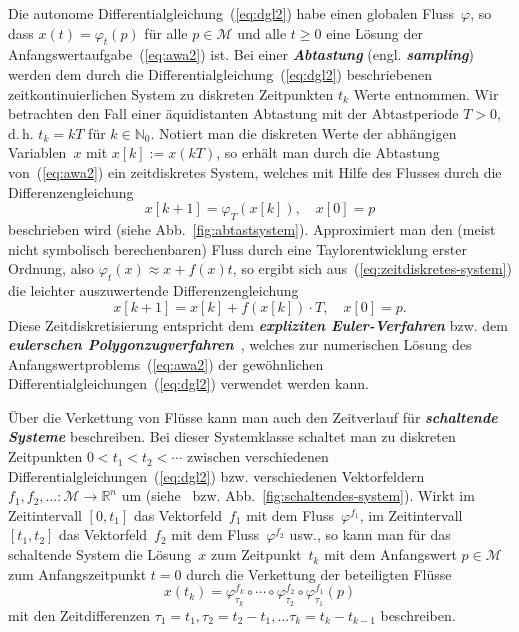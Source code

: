 \begin{remark}
\label{rem:Flussverkettung-zeitdiskret}Die autonome Differentialgleichung~(\ref{eq:dgl2})
habe einen globalen Fluss~$\varphi$, so dass $x(t)=\varphi_{t}(p)$
für alle $p\in\mathcal{M}$ und alle $t\geq0$ eine Lösung der Anfangswertaufgabe~(\ref{eq:awa2})
ist. Bei einer \textbf{\em Abtastung} (engl. \textbf{\em sampling})
werden dem durch die Differentialgleichung~(\ref{eq:dgl2}) beschriebenen
zeitkontinuierlichen System zu diskreten Zeitpunkten $t_{k}$ Werte
entnommen. Wir betrachten den Fall einer äquidistanten Abtastung mit
der Abtastperiode $T>0$, d.\,h. $t_{k}=kT$ für $k\in{\mathbb{N}_0}$. Notiert
man die diskreten Werte der abhängigen Variablen~$x$ mit $x[k]:=x(kT)$,
so erhält man durch die Abtastung von~(\ref{eq:awa2}) ein zeitdiskretes
System, welches mit Hilfe des Flusses durch die Differenzengleichung
\begin{equation}
x[k+1]=\varphi_{T}(x[k]),\quad x[0]=p\label{eq:zeitdiskretes-system}
\end{equation}
beschrieben wird (siehe Abb.~\ref{fig:abtastsystem}). Approximiert
man den (meist nicht symbolisch berechenbaren) Fluss durch eine Taylorentwicklung
erster Ordnung, also $\varphi_{t}(x)\approx x+f(x)t$, so ergibt sich
aus~(\ref{eq:zeitdiskretes-system}) die leichter auszuwertende Differenzengleichung
\[
x[k+1]=x[k]+f(x[k])\cdot T,\quad x[0]=p.
\]
Diese Zeitdiskretisierung entspricht dem \textbf{\em expliziten Euler-Verfahren}
bzw. dem \textbf{\em eulerschen Polygonzugverfahren}~\cite{bronstein2000,baerwolff2006},
welches zur numerischen Lösung des Anfangswertproblems~(\ref{eq:awa2})
der gewöhnlichen Differentialgleichungen~(\ref{eq:dgl2}) verwendet
werden kann.
\end{remark}


\begin{remark}
\label{rem:Flussverkettung-schaltende-Systeme}Über die Verkettung
von Flüsse kann man auch den Zeitverlauf für \textbf{\em schaltende Systeme}
beschreiben. Bei dieser Systemklasse schaltet man zu diskreten Zeitpunkten
$0<t_{1}<t_{2}<\cdots$ zwischen verschiedenen Differentialgleichungen~(\ref{eq:dgl2})
bzw. verschiedenen Vektorfeldern $f_{1},f_{2},\ldots:\mathcal{M}\to{\mathbb{R}}^{n}$
um (siehe~\cite{liberzon2003} bzw. Abb.~\ref{fig:schaltendes-system}).
Wirkt im Zeitintervall $[0,t_{1}]$ das Vektorfeld~$f_{1}$ mit dem
Fluss~$\varphi^{f_{1}}$, im Zeitintervall $[t_{1},t_{2}]$ das Vektorfeld~$f_{2}$
mit dem Fluss~$\varphi^{f_{2}}$ usw., so kann man für das schaltende
System die Lösung~$x$ zum Zeitpunkt~$t_{k}$ mit dem Anfangswert
$p\in\mathcal{M}$ zum Anfangszeitpunkt $t=0$ durch die Verkettung
der beteiligten Flüsse
\begin{equation}
x(t_{k})=\varphi_{\tau_{k}}^{f_{k}}\circ\cdots\circ\varphi_{\tau_{2}}^{f_{2}}\circ\varphi_{\tau_{1}}^{f_{1}}(p)\label{eq:verkettung-von-fluessen-geschaltet}
\end{equation}
mit den Zeitdifferenzen $\tau_{1}=t_{1},\tau_{2}=t_{2}-t_{1},\ldots\tau_{k}=t_{k}-t_{k-1}$
beschreiben.
\end{remark}


